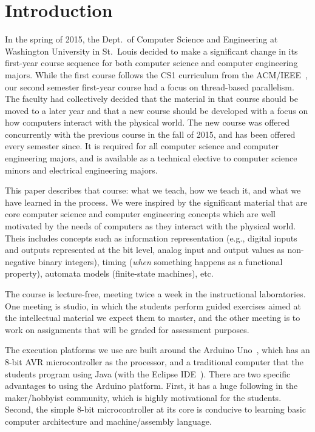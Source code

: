 \section{Introduction}
\label{sec:intro}

In the spring of 2015, the Dept.~of Computer Science and Engineering at
Washington University in St.~Louis decided to make a significant change
in its first-year course sequence for both computer science and
computer engineering majors.  While the first course follows
the CS1 curriculum from the ACM/IEEE~\cite{cs13}, our second semester
first-year course had a focus on thread-based parallelism.  The faculty
had collectively decided that the material in that course should be moved
to a later year and that a new course should be developed with a focus on 
how computers interact with the physical world.
The new course was offered concurrently with the previous course in the
fall of 2015, and has been offered every semester since.
It is required for all computer science and computer engineering majors,
and is available as a technical elective to computer science minors and electrical
engineering majors.

This paper describes that course: what we teach, how we teach it, and
what we have learned in the process.
We were inspired by the significant material that are core
computer science and computer engineering concepts which are well motivated
by the needs of computers as they interact with the physical world.
Theis includes concepts such as information representation (e.g., digital inputs
and outputs represented at the bit level, analog input and output values as
non-negative binary integers),
timing (\emph{when} something happens as a functional property),
automata models (finite-state machines), etc.

The course is lecture-free, meeting twice a week in the
instructional laboratories.  One meeting is studio, in which the
students perform guided exercises aimed at the intellectual material we
expect them to master, and the other meeting is to work on assignments
that will be graded for assessment purposes.

The execution platforms we use are built around the Arduino Uno~\cite{arduino},
which has an 8-bit AVR microcontroller as the processor,
and a traditional computer that the
students program using Java (with the Eclipse IDE~\cite{eclipse}).
There are two specific advantages to using the Arduino platform.
First, it has a huge following in the maker/hobbyist community, which
is highly motivational for the students. 
Second, the simple 8-bit microcontroller at its core is conducive to
learning basic computer architecture and machine/assembly language.


